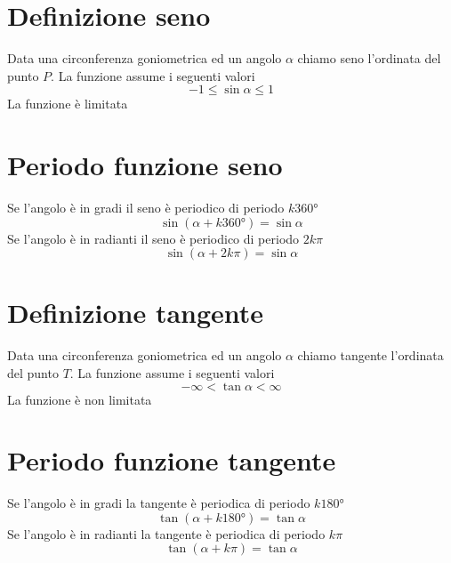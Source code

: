 \section{Definizione seno}
Data una circonferenza goniometrica ed un angolo $\alpha$ chiamo seno l'ordinata del punto $P$. La funzione assume i seguenti valori
\begin{equation}
-1\leq \sin\alpha \leq 1
\end{equation}
La funzione è limitata
\begin{center}
	
\end{center}
\section{Periodo funzione seno}
Se l'angolo è in gradi il seno è periodico di periodo $k\ang{360}$
\begin{equation}
\sin(\alpha+k\ang{360;;})=\sin\alpha
\end{equation}
Se l'angolo è in radianti il seno è periodico di periodo $2k\pi$
\begin{equation}
\sin(\alpha+2k\pi)=\sin\alpha
\end{equation}
\section{Definizione tangente}
Data una circonferenza goniometrica ed un angolo $\alpha$ chiamo tangente l'ordinata del punto $T$.
La funzione assume i seguenti valori
\begin{equation}
-\infty<\tan\alpha< \infty
\end{equation}
La funzione è non limitata
\begin{center}
	
\end{center}
\section{Periodo funzione tangente}
Se l'angolo è in gradi la tangente è periodica di periodo $k\ang{180}$
\begin{equation}
\tan(\alpha+k\ang{180;;})=\tan\alpha
\end{equation}
Se l'angolo è in radianti la tangente è periodica di periodo $k\pi$
\begin{equation}
\tan(\alpha+k\pi)=\tan\alpha
\end{equation}
